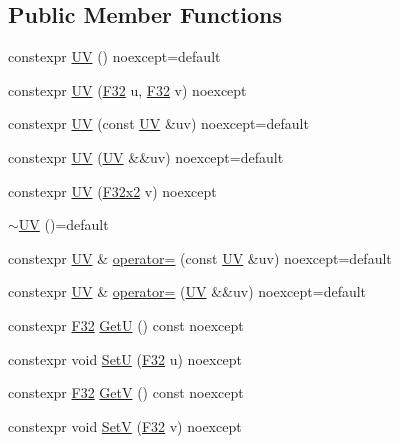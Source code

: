 \subsection*{Public Member Functions}
\begin{DoxyCompactItemize}
\item 
constexpr \mbox{\hyperlink{structmage_1_1_u_v_adc1ec1943378b391e1eeba840070b62c}{UV}} () noexcept=default
\item 
constexpr \mbox{\hyperlink{structmage_1_1_u_v_a383d9dff35f65343ea90284a07581b1f}{UV}} (\mbox{\hyperlink{namespacemage_aa97e833b45f06d60a0a9c4fc22ae02c0}{F32}} u, \mbox{\hyperlink{namespacemage_aa97e833b45f06d60a0a9c4fc22ae02c0}{F32}} v) noexcept
\item 
constexpr \mbox{\hyperlink{structmage_1_1_u_v_a2756ef5aa4b99bd8d8bce4b43c205e30}{UV}} (const \mbox{\hyperlink{structmage_1_1_u_v}{UV}} \&uv) noexcept=default
\item 
constexpr \mbox{\hyperlink{structmage_1_1_u_v_aea441530786bac9c6eb02bff653834bd}{UV}} (\mbox{\hyperlink{structmage_1_1_u_v}{UV}} \&\&uv) noexcept=default
\item 
constexpr \mbox{\hyperlink{structmage_1_1_u_v_ab5b287a94fef45b70f7c6d50ede33bff}{UV}} (\mbox{\hyperlink{namespacemage_a9dc0d34d6ecc87e4cfa4a826102117bc}{F32x2}} v) noexcept
\item 
\mbox{\hyperlink{structmage_1_1_u_v_a9389be8cc9bb64861b69f79b44b6dd1b}{$\sim$\+UV}} ()=default
\item 
constexpr \mbox{\hyperlink{structmage_1_1_u_v}{UV}} \& \mbox{\hyperlink{structmage_1_1_u_v_a53bf93c8a9b97f07d2b7db5a7e22be51}{operator=}} (const \mbox{\hyperlink{structmage_1_1_u_v}{UV}} \&uv) noexcept=default
\item 
constexpr \mbox{\hyperlink{structmage_1_1_u_v}{UV}} \& \mbox{\hyperlink{structmage_1_1_u_v_a2737f10decab84904fbd16a3f213c470}{operator=}} (\mbox{\hyperlink{structmage_1_1_u_v}{UV}} \&\&uv) noexcept=default
\item 
constexpr \mbox{\hyperlink{namespacemage_aa97e833b45f06d60a0a9c4fc22ae02c0}{F32}} \mbox{\hyperlink{structmage_1_1_u_v_a8587903b07cab58428d01ed9ded97dd4}{GetU}} () const noexcept
\item 
constexpr void \mbox{\hyperlink{structmage_1_1_u_v_a0c7826aed81123c47129d552c696ab18}{SetU}} (\mbox{\hyperlink{namespacemage_aa97e833b45f06d60a0a9c4fc22ae02c0}{F32}} u) noexcept
\item 
constexpr \mbox{\hyperlink{namespacemage_aa97e833b45f06d60a0a9c4fc22ae02c0}{F32}} \mbox{\hyperlink{structmage_1_1_u_v_a95b38718cb3eeaacebdfa306b4921d90}{GetV}} () const noexcept
\item 
constexpr void \mbox{\hyperlink{structmage_1_1_u_v_aa76b301726c43197f6de07ff6fec71b2}{SetV}} (\mbox{\hyperlink{namespacemage_aa97e833b45f06d60a0a9c4fc22ae02c0}{F32}} v) noexcept
\end{DoxyCompactItemize}


